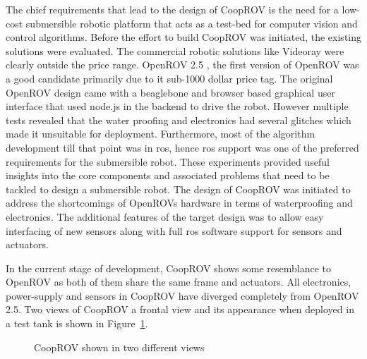 \documentclass {udthesis}
\begin{document}
The chief requirements that lead to the design of CoopROV is the need for a low-cost submersible robotic platform that acts as a test-bed for computer vision and control algorithms. Before the effort to build CoopROV was initiated, the existing solutions were evaluated. The commercial robotic solutions like Videoray were clearly outside the price range. OpenROV 2.5 \cite{openrov}, the first version of OpenROV was a good candidate primarily due to it sub-1000 dollar price tag. The original OpenROV design came with a beaglebone and browser based graphical user interface that used node.js \cite{nodejs} in the backend to drive the robot. However multiple tests revealed that the water proofing and electronics had several glitches which made it unsuitable for deployment. Furthermore, most of the algorithm development till that point was in \gls{ros}, hence \gls{ros} support was one of the 
preferred requirements for the submersible robot. These experiments provided useful insights into the core components and associated problems that need to be tackled to design a submersible robot. The design of CoopROV was initiated to address the shortcomings of OpenROVs hardware in terms of waterproofing and electronics. The additional features of the target design was to allow easy interfacing of new sensors along with full \gls{ros} software support for sensors and actuators.

In the current stage of development, CoopROV shows some resemblance to OpenROV as both of them share the same frame and actuators. All electronics, power-supply and sensors in CoopROV have diverged completely from OpenROV 2.5. Two views of CoopROV a frontal view and its appearance when deployed in a test tank is shown in Figure~\ref{fig:cooprov}.
%
\begin{figure} \label{fig:cooprov}
\centering
{}
\caption{CoopROV shown in two different views}
\end{figure} 
\end{document}
